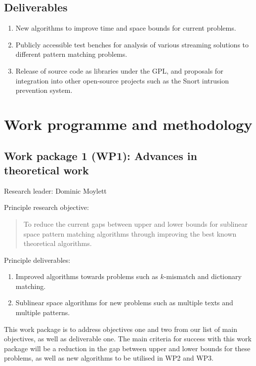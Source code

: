 \documentclass[a4paper,11pt]{article}
\begin{document}
    \subsection{Deliverables}

    \begin{enumerate}
        \item New algorithms to improve time and space bounds for current problems.
        \item Publicly accessible test benches for analysis of various streaming solutions to different pattern matching problems.
        \item Release of source code as libraries under the GPL, and proposals for integration into other open-source projects such as the Snort intrusion prevention system.
    \end{enumerate}

    \section{Work programme and methodology}

    \subsection*{Work package 1 (WP1): Advances in theoretical work}

    Research leader: Dominic Moylett

    Principle research objective:
    \begin{quote}
        To reduce the current gaps between upper and lower bounds for sublinear space pattern matching algorithms through improving the best known theoretical algorithms.
    \end{quote}

    Principle deliverables:
    \begin{enumerate}
        \item Improved algorithms towards problems such as $k$-mismatch and dictionary matching.
        \item Sublinear space algorithms for new problems such as multiple texts and multiple patterns.
    \end{enumerate}

    This work package is to address objectives one and two from our list of main objectives, as well as deliverable one. The main criteria for success with this work package will be a reduction in the gap between upper and lower bounds for these problems, as well as new algorithms to be utilised in WP2 and WP3.
\end{document}

